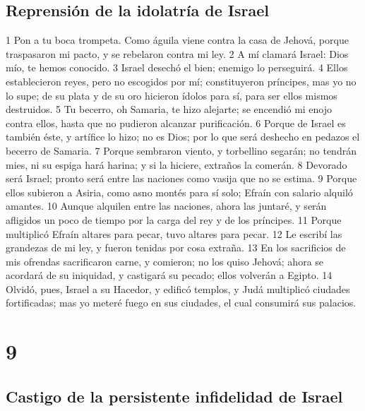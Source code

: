 \section*{Reprensión de la idolatría de Israel}

1 Pon a tu boca trompeta. Como águila viene contra la casa de Jehová, porque traspasaron mi pacto, y se rebelaron contra mi ley.
2 A mí clamará Israel: Dios mío, te hemos conocido.
3 Israel desechó el bien; enemigo lo perseguirá.
4 Ellos establecieron reyes, pero no escogidos por mí; constituyeron príncipes, mas yo no lo supe; de su plata y de su oro hicieron ídolos para sí, para ser ellos mismos destruidos.
5 Tu becerro, oh Samaria, te hizo alejarte; se encendió mi enojo contra ellos, hasta que no pudieron alcanzar purificación.
6 Porque de Israel es también éste, y artífice lo hizo; no es Dios; por lo que será deshecho en pedazos el becerro de Samaria.
7 Porque sembraron viento, y torbellino segarán; no tendrán mies, ni su espiga hará harina; y si la hiciere, extraños la comerán.
8 Devorado será Israel; pronto será entre las naciones como vasija que no se estima.
9 Porque ellos subieron a Asiria, como asno montés para sí solo; Efraín con salario alquiló amantes.
10 Aunque alquilen entre las naciones, ahora las juntaré, y serán afligidos un poco de tiempo por la carga del rey y de los príncipes.
11 Porque multiplicó Efraín altares para pecar, tuvo altares para pecar.
12 Le escribí las grandezas de mi ley, y fueron tenidas por cosa extraña.
13 En los sacrificios de mis ofrendas sacrificaron carne, y comieron; no los quiso Jehová; ahora se acordará de su iniquidad, y castigará su pecado; ellos volverán a Egipto.
14 Olvidó, pues, Israel a su Hacedor, y edificó templos, y Judá multiplicó ciudades fortificadas; mas yo meteré fuego en sus ciudades, el cual consumirá sus palacios.

\chapter{9}

\section*{Castigo de la persistente infidelidad de Israel}

